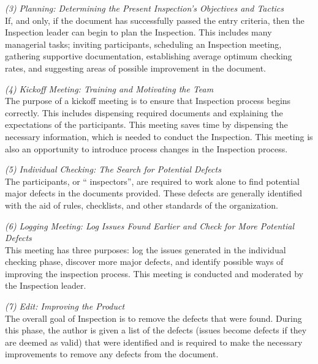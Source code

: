 \begin{flushleft}
  \textit{(3) Planning: Determining the Present Inspection's Objectives and
    Tactics} \\ If, and only, if the document has successfully passed the
  entry criteria, then the Inspection leader can begin to plan the
  Inspection. This includes many managerial tasks; inviting participants,
  scheduling an Inspection meeting, gathering supportive documentation,
  establishing average optimum checking rates, and suggesting areas of
  possible improvement in the document.
\end{flushleft}

\begin{flushleft}
  \textit{(4) Kickoff Meeting: Training and Motivating the Team} \\ The
  purpose of a kickoff meeting is to ensure that Inspection process begins
  correctly. This includes dispensing required documents and explaining the
  expectations of the participants. This meeting saves time by dispensing
  the necessary information, which is needed to conduct the Inspection.
  This meeting is also an opportunity to introduce process changes in the
  Inspection process.
\end{flushleft}

\begin{flushleft}
  \textit{(5) Individual Checking: The Search for Potential Defects} \\ The
  participants, or `` inspectors'', are required to work alone to find
  potential major defects in the documents provided. These defects are
  generally identified with the aid of rules, checklists, and other
  standards of the organization.
\end{flushleft}

\begin{flushleft}
  \textit{(6) Logging Meeting: Log Issues Found Earlier and Check for More
    Potential Defects} \\ This meeting has three purposes: log the issues
  generated in the individual checking phase, discover more major defects,
  and identify possible ways of improving the inspection process. This
  meeting is conducted and moderated by the Inspection leader.
\end{flushleft}

\begin{flushleft}
  \textit{(7) Edit: Improving the Product} \\ The overall goal of
  Inspection is to remove the defects that were found. During this phase,
  the author is given a list of the defects (issues become defects if they
  are deemed as valid) that were identified and is required to make the
  necessary improvements to remove any defects from the document.
\end{flushleft}

